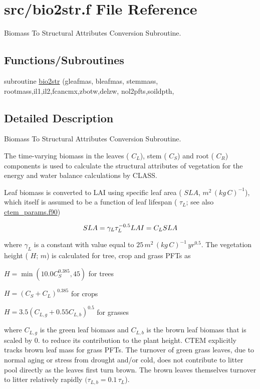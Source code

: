 \hypertarget{bio2str_8f}{}\section{src/bio2str.f File Reference}
\label{bio2str_8f}


Biomass To Structural Attributes Conversion Subroutine.  


\subsection*{Functions/\+Subroutines}
\begin{DoxyCompactItemize}
\item 
subroutine \hyperlink{bio2str_8f_a3bc457fd89cd3f3af038e068b38b5919}{bio2str} (gleafmas, bleafmas, stemmass, rootmass,il1,il2,fcancmx,zbotw,delzw, nol2pfts,soildpth,
\end{DoxyCompactItemize}


\subsection{Detailed Description}
Biomass To Structural Attributes Conversion Subroutine. 

The time-\/varying biomass in the leaves ( $C_L$), stem ( $C_S$) and root ( $C_R$) components is used to calculate the structural attributes of vegetation for the energy and water balance calculations by C\+L\+A\+S\+S.

Leaf biomass is converted to L\+A\+I using specific leaf area ( ${SLA}$, $m^2\,(kg\,C)^{-1}$), which itself is assumed to be a function of leaf lifespan ( $\tau_L$; see also \hyperlink{ctem__params_8f90}{ctem\+\_\+params.\+f90})

\[ \label{sla} SLA= \gamma_L\tau_L^{-0.5}\\ LAI = C_LSLA\nonumber \]

where $\gamma_L$ is a constant with value equal to $25\,m^2\,(kg\,C)^{-1}\,yr^{0.5}$. The vegetation height ( $H$; $m$) is calculated for tree, crop and grass P\+F\+Ts as

$ H = \min (10.0C_S^{0.385},45) $ for trees

$ H = (C_S + C_L)^{0.385} $ for crops

$ H = 3.5 (C_{L,g} + 0.55C_{L,b})^{0.5} $ for grasses

where $C_{L,g}$ is the green leaf biomass and $C_{L,b}$ is the brown leaf biomass that is scaled by 0. to reduce its contribution to the plant height. C\+T\+E\+M explicitly tracks brown leaf mass for grass P\+F\+Ts. The turnover of green grass leaves, due to normal aging or stress from drought and/or cold, does not contribute to litter pool directly as the leaves first turn brown. The brown leaves themselves turnover to litter relatively rapidly $(\tau_{L,b} = 0.1\,\tau_L$).

